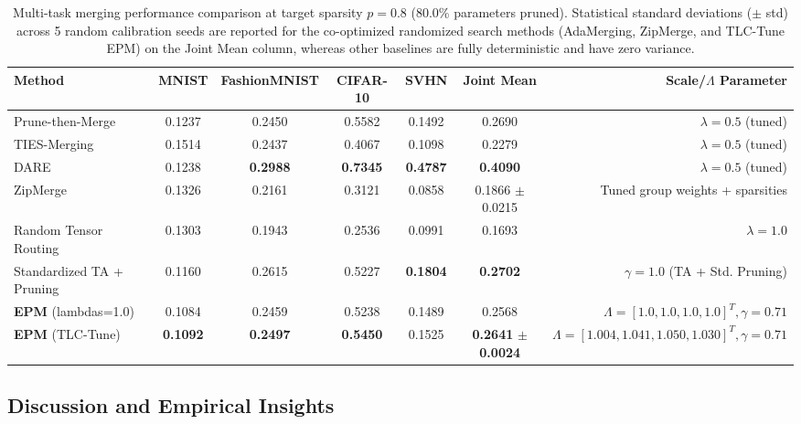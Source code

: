 \begin{table}[t]
\caption{Multi-task merging performance comparison at target sparsity $p=0.8$ (80.0\% parameters pruned). Statistical standard deviations ($\pm$ std) across 5 random calibration seeds are reported for the co-optimized randomized search methods (AdaMerging, ZipMerge, and TLC-Tune EPM) on the Joint Mean column, whereas other baselines are fully deterministic and have zero variance.}
\label{tab:results_p8}
\vskip 0.15in
\begin{center}
\begin{small}
\begin{sc}
\begin{tabular}{lcccccr}
\toprule
Method & MNIST & FashionMNIST & CIFAR-10 & SVHN & Joint Mean & Scale/$\Lambda$ Parameter \\
\midrule
Prune-then-Merge & 0.1237 & 0.2450 & 0.5582 & 0.1492 & 0.2690 & $\lambda=0.5$ (tuned) \\
TIES-Merging     & 0.1514 & 0.2437 & 0.4067 & 0.1098 & 0.2279 & $\lambda=0.5$ (tuned) \\
DARE             & 0.1238 & \textbf{0.2988} & \textbf{0.7345} & \textbf{0.4787} & \textbf{0.4090} & $\lambda=0.5$ (tuned) \\
ZipMerge         & 0.1326 & 0.2161 & 0.3121 & 0.0858 & 0.1866 $\pm$ 0.0215 & Tuned group weights + sparsities \\
Random Tensor Routing & 0.1303 & 0.1943 & 0.2536 & 0.0991 & 0.1693 & $\lambda=1.0$ \\
Standardized TA + Pruning & 0.1160 & 0.2615 & 0.5227 & \textbf{0.1804} & \textbf{0.2702} & $\gamma=1.0$ (TA + Std. Pruning) \\
\midrule
\textbf{EPM} (lambdas=1.0) & 0.1084 & 0.2459 & 0.5238 & 0.1489 & 0.2568 & $\Lambda=[1.0, 1.0, 1.0, 1.0]^T, \gamma=0.71$ \\
\textbf{EPM} (TLC-Tune)    & \textbf{0.1092} & \textbf{0.2497} & \textbf{0.5450} & 0.1525 & \textbf{0.2641} $\pm$ \textbf{0.0024} & $\Lambda=[1.004, 1.041, 1.050, 1.030]^T, \gamma=0.71$ \\
\bottomrule
\end{tabular}
\end{sc}
\end{small}
\end{center}
\vskip -0.1in
\end{table}

\subsection{Discussion and Empirical Insights}

